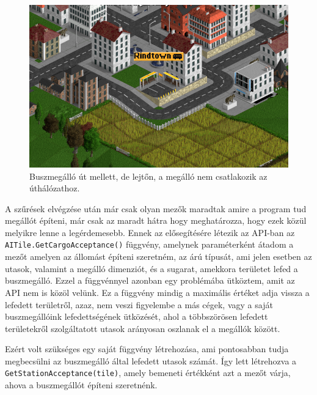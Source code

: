 \begin{figure} [h!]
	\centering
	\includegraphics[scale=0.8]{images/lejtomegallo.png}
	\caption{Buszmegálló út mellett, de lejtőn, a megálló nem csatlakozik az úthálózathoz.}
	\label{fig:lejtomegallo}
\end{figure}

A szűrések elvégzése után már csak olyan mezők maradtak amire a program tud megállót építeni, már csak az maradt hátra hogy meghatározza, hogy ezek közül melyikre lenne a legérdemesebb. Ennek az elősegítésére létezik az API-ban az \\ \texttt{AITile.GetCargoAcceptance()} függvény, amelynek paraméterként átadom a mezőt amelyen az állomást építeni szeretném, az árú típusát, ami jelen esetben az utasok, valamint a megálló dimenziót, és a sugarat, amekkora területet lefed a buszmegálló. Ezzel a függvénnyel azonban egy problémába ütköztem, amit az API nem is közöl velünk. Ez a függvény mindig a maximális értéket adja vissza a lefedett területről, azaz, nem veszi figyelembe a más cégek, vagy a saját buszmegállóink lefedettségének ütközését, ahol a többszörösen lefedett területekről szolgáltatott utasok arányosan oszlanak el a megállók között.

Ezért volt szükséges egy saját függvény létrehozása, ami pontosabban tudja megbecsülni az buszmegálló által lefedett utasok számát. Így lett létrehozva a \\ \texttt{GetStationAcceptance(tile)}, amely bemeneti értékként azt a mezőt várja, ahova a buszmegállót építeni szeretnénk.

